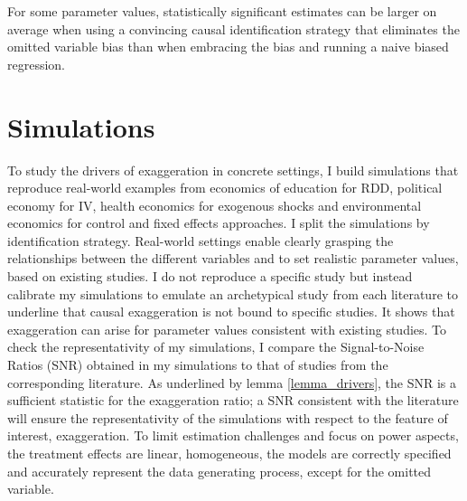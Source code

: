\documentclass[usletter, 12pt]{article}
\begin{document}
			For some parameter values, statistically significant estimates can be larger on average when using a convincing causal identification strategy that eliminates the omitted variable bias than when embracing the bias and running a naive biased regression.	
	


				
	\section{Simulations} \label{simulations}
		
    
    		To study the drivers of exaggeration in concrete settings, I build simulations that reproduce real-world examples from economics of education for RDD, %
		political economy for IV, health economics for exogenous shocks and environmental economics for control and fixed effects approaches. I split the simulations by identification strategy. %
		 Real-world settings enable clearly grasping the relationships between the different variables and to set realistic parameter values, based on existing studies. I do not reproduce a specific study but instead calibrate my simulations to emulate an archetypical study from each literature to underline that causal exaggeration is not bound to specific studies. It shows that exaggeration can arise for parameter values consistent with existing studies. To check the representativity of my simulations, I compare the Signal-to-Noise Ratios (SNR) obtained in my simulations to that of studies from the corresponding literature. As underlined by lemma \ref{lemma_drivers}, the SNR is a sufficient statistic for the exaggeration ratio; a SNR consistent with the literature will ensure the representativity of the simulations with respect to the feature of interest, exaggeration. 
		 To limit estimation challenges and focus on power aspects, the treatment effects are linear, homogeneous, the models are correctly specified and accurately represent the data generating process, except for the omitted variable. 
    
\end{document}
